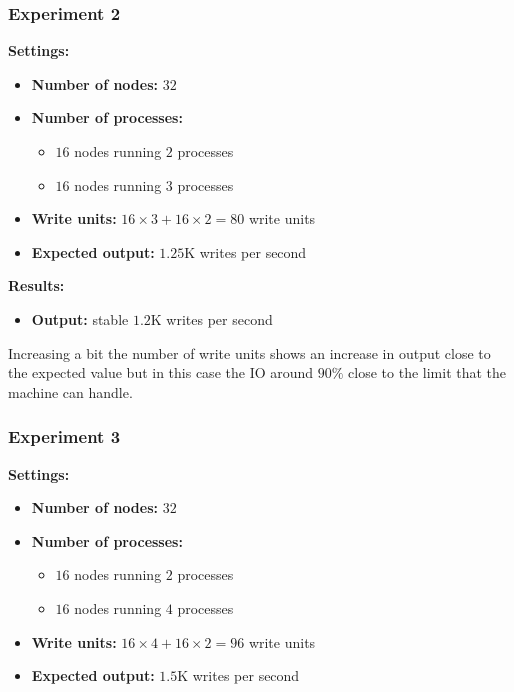\subsubsection{Experiment 2}\label{subsubsec:appendix_benchmarks_exp2}
\medskip
\noindent\textbf{Settings:}
\begin{itemize}
 \item \textbf{Number of nodes:} $32$
 \item \textbf{Number of processes:}
 \begin{itemize}
  \item$16$ nodes running $2$ processes
  \item$16$ nodes running $3$ processes
 \end{itemize}
 \item \textbf{Write units:} $16 \times 3 + 16 \times 2 = 80$ write units
 \item \textbf{Expected output:} $1.25$K writes per second
\end{itemize}

\medskip
\noindent\textbf{Results:}
\begin{itemize}
 \item \textbf{Output:} stable $1.2$K writes per second
\end{itemize}

Increasing a bit the number of write units shows an increase in output close to the expected value but in this case the IO around $90\%$ close to the limit that the machine can handle.

\subsubsection{Experiment 3}\label{subsubsec:appendix_benchmarks_exp3}
\medskip
\noindent\textbf{Settings:}
\begin{itemize}
 \item \textbf{Number of nodes:} $32$
 \item \textbf{Number of processes:}
 \begin{itemize}
  \item$16$ nodes running $2$ processes
  \item$16$ nodes running $4$ processes
 \end{itemize}
 \item \textbf{Write units:} $16 \times 4 + 16 \times 2 = 96$ write units
 \item \textbf{Expected output:} $1.5$K writes per second
\end{itemize}

